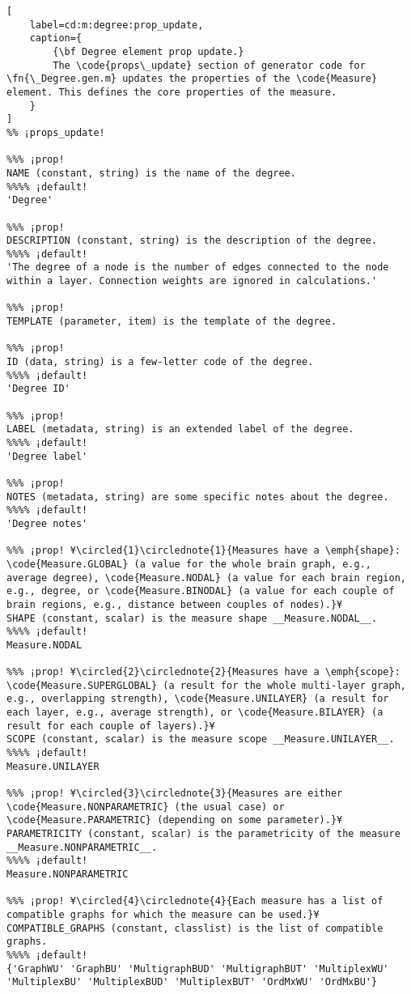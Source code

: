 \documentclass{tufte-handout}
\begin{document}
\begin{lstlisting}[
	label=cd:m:degree:prop_update,
	caption={
		{\bf Degree element prop update.}
		The \code{props\_update} section of generator code for \fn{\_Degree.gen.m} updates the properties of the \code{Measure} element. This defines the core properties of the measure.
	}
]
%% ¡props_update!

%%% ¡prop!
NAME (constant, string) is the name of the degree.
%%%% ¡default!
'Degree'

%%% ¡prop!
DESCRIPTION (constant, string) is the description of the degree.
%%%% ¡default!
'The degree of a node is the number of edges connected to the node within a layer. Connection weights are ignored in calculations.'

%%% ¡prop!
TEMPLATE (parameter, item) is the template of the degree.

%%% ¡prop!
ID (data, string) is a few-letter code of the degree.
%%%% ¡default!
'Degree ID'

%%% ¡prop!
LABEL (metadata, string) is an extended label of the degree.
%%%% ¡default!
'Degree label'

%%% ¡prop!
NOTES (metadata, string) are some specific notes about the degree.
%%%% ¡default!
'Degree notes'

%%% ¡prop! ¥\circled{1}\circlednote{1}{Measures have a \emph{shape}: \code{Measure.GLOBAL} (a value for the whole brain graph, e.g., average degree), \code{Measure.NODAL} (a value for each brain region, e.g., degree, or \code{Measure.BINODAL} (a value for each couple of brain regions, e.g., distance between couples of nodes).}¥
SHAPE (constant, scalar) is the measure shape __Measure.NODAL__.
%%%% ¡default!
Measure.NODAL

%%% ¡prop! ¥\circled{2}\circlednote{2}{Measures have a \emph{scope}: \code{Measure.SUPERGLOBAL} (a result for the whole multi-layer graph, e.g., overlapping strength), \code{Measure.UNILAYER} (a result for each layer, e.g., average strength), or \code{Measure.BILAYER} (a result for each couple of layers).}¥
SCOPE (constant, scalar) is the measure scope __Measure.UNILAYER__.
%%%% ¡default!
Measure.UNILAYER

%%% ¡prop! ¥\circled{3}\circlednote{3}{Measures are either \code{Measure.NONPARAMETRIC} (the usual case) or \code{Measure.PARAMETRIC} (depending on some parameter).}¥
PARAMETRICITY (constant, scalar) is the parametricity of the measure __Measure.NONPARAMETRIC__.
%%%% ¡default!
Measure.NONPARAMETRIC

%%% ¡prop! ¥\circled{4}\circlednote{4}{Each measure has a list of compatible graphs for which the measure can be used.}¥
COMPATIBLE_GRAPHS (constant, classlist) is the list of compatible graphs.
%%%% ¡default!
{'GraphWU' 'GraphBU' 'MultigraphBUD' 'MultigraphBUT' 'MultiplexWU' 'MultiplexBU' 'MultiplexBUD' 'MultiplexBUT' 'OrdMxWU' 'OrdMxBU'}


\end{lstlisting}
\end{document}
